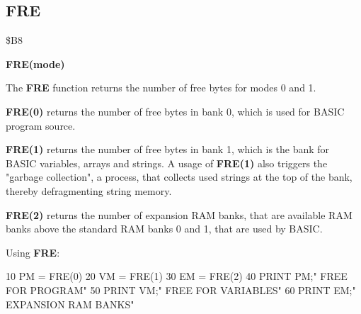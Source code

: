 
\newpage
\subsection{FRE}
\begin{description}[leftmargin=3cm,style=nextline]
\item [Token:] \$B8
\item [Format:] {\bf FRE(mode)}
\item [Usage:] The {\bf FRE} function returns the number of free
               bytes for modes 0 and 1.

               {\bf FRE(0)} returns the number of free bytes in
               bank 0, which is used for BASIC program source.

               {\bf FRE(1)} returns the number of free bytes in
               bank 1, which is the bank for BASIC variables, arrays
               and strings. A usage of {\bf FRE(1)} also triggers the
               "garbage collection", a process, that collects
               used strings at the top of the bank, thereby
               defragmenting string memory.

               {\bf FRE(2)} returns the number of expansion
               RAM banks, that are available RAM banks above
               the standard RAM banks 0 and 1, that are used by BASIC.

\item [Example:] Using {\bf FRE}:
\begin{screenoutput}
10 PM = FRE(0)
20 VM = FRE(1)
30 EM = FRE(2)
40 PRINT PM;" FREE FOR PROGRAM"
50 PRINT VM;" FREE FOR VARIABLES"
60 PRINT EM;" EXPANSION RAM BANKS"
\end{screenoutput}
\end{description}


\newpage
